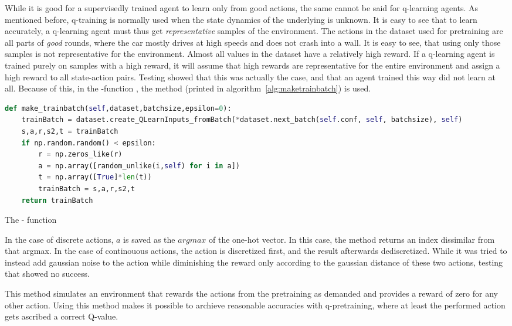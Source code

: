 While it is good for a supervisedly trained agent to learn only from good actions, the same cannot be said for q-learning agents. As mentioned before, q-training is normally used when the state dynamics of the underlying is unknown. It is easy to see that to learn accurately, a q-learning agent must thus get \textit{representative} samples of the environment. The actions in the dataset used for pretraining are all parts of \textit{good} rounds, where the car mostly drives at high speeds and does not crash into a wall. It is easy to see, that using only those samples is not representative for the environment. Almost all values in the dataset have a relatively high reward. If a q-learning agent is trained purely on samples with a high reward, it will assume that high rewards are representative for the entire environment and assign a high reward to all state-action pairs. Testing showed that this was actually the case, and that an agent trained this way did not learn at all. Because of this, in the -function , the method  (printed in algorithm~\ref{alg:maketrainbatch}) is used.

\begin{algorithm}[h]
\begin{lstlisting}[language=Python, style=Python, frame=none]
def make_trainbatch(self,dataset,batchsize,epsilon=0):
	trainBatch = dataset.create_QLearnInputs_fromBatch(*dataset.next_batch(self.conf, self, batchsize), self)
	s,a,r,s2,t = trainBatch
	if np.random.random() < epsilon:
		r = np.zeros_like(r)
		a = np.array([random_unlike(i,self) for i in a])
		t = np.array([True]*len(t))
		trainBatch = s,a,r,s2,t
	return trainBatch
\end{lstlisting}%
\caption{The  - function}
\label{alg:maketrainbatch}
\end{algorithm}

In the case of discrete actions, $a$ is saved as the $argmax$ of the one-hot vector. In this case, the method  returns an index dissimilar from that argmax. In the case of continouous actions, the action is discretized first, and the result afterwards dediscretized. While it was tried to instead add gaussian noise to the action while diminishing the reward only according to the gaussian distance of these two actions, testing that showed no success.

This method simulates an environment that rewards the actions from the pretraining as demanded and provides a reward of zero for any other action. Using this method makes it possible to archieve reasonable accuracies with q-pretraining, where at least the performed action gets ascribed a correct Q-value. 

